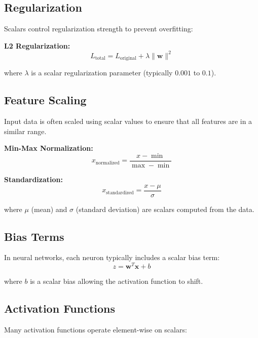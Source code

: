 \documentclass[11pt,a4paper]{article}
\begin{document}
\subsection{Regularization}

Scalars control regularization strength to prevent overfitting:

\textbf{L2 Regularization:}
\begin{equation}
    L_{\text{total}} = L_{\text{original}} + \lambda \|\mathbf{w}\|^2
\end{equation}

where $\lambda$ is a scalar regularization parameter (typically $0.001$ to $0.1$).

\subsection{Feature Scaling}

Input data is often scaled using scalar values to ensure that all features are in a similar range.

\textbf{Min-Max Normalization:}
\begin{equation}
    x_{\text{normalized}} = \frac{x - \min}{\max - \min}
\end{equation}

\textbf{Standardization:}
\begin{equation}
    x_{\text{standardized}} = \frac{x - \mu}{\sigma}
\end{equation}

where $\mu$ (mean) and $\sigma$ (standard deviation) are scalars computed from the data.

\subsection{Bias Terms}

In neural networks, each neuron typically includes a scalar bias term:
\begin{equation}
    z = \mathbf{w}^T \mathbf{x} + b
\end{equation}

where $b$ is a scalar bias allowing the activation function to shift.

\subsection{Activation Functions}

Many activation functions operate element-wise on scalars:
\end{document}
